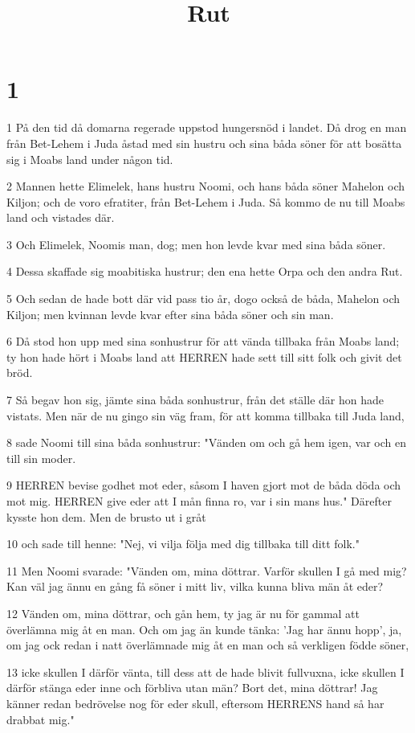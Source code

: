

\title{Rut}


\chapter{1}

\par 1 På den tid då domarna regerade uppstod hungersnöd i landet. Då drog en man från Bet-Lehem i Juda åstad med sin hustru och sina båda söner för att bosätta sig i Moabs land under någon tid.
\par 2 Mannen hette Elimelek, hans hustru Noomi, och hans båda söner Mahelon och Kiljon; och de voro efratiter, från Bet-Lehem i Juda. Så kommo de nu till Moabs land och vistades där.
\par 3 Och Elimelek, Noomis man, dog; men hon levde kvar med sina båda söner.
\par 4 Dessa skaffade sig moabitiska hustrur; den ena hette Orpa och den andra Rut.
\par 5 Och sedan de hade bott där vid pass tio år, dogo också de båda, Mahelon och Kiljon; men kvinnan levde kvar efter sina båda söner och sin man.
\par 6 Då stod hon upp med sina sonhustrur för att vända tillbaka från Moabs land; ty hon hade hört i Moabs land att HERREN hade sett till sitt folk och givit det bröd.
\par 7 Så begav hon sig, jämte sina båda sonhustrur, från det ställe där hon hade vistats. Men när de nu gingo sin väg fram, för att komma tillbaka till Juda land,
\par 8 sade Noomi till sina båda sonhustrur: "Vänden om och gå hem igen, var och en till sin moder.
\par 9 HERREN bevise godhet mot eder, såsom I haven gjort mot de båda döda och mot mig. HERREN give eder att I mån finna ro, var i sin mans hus." Därefter kysste hon dem. Men de brusto ut i gråt
\par 10 och sade till henne: "Nej, vi vilja följa med dig tillbaka till ditt folk."
\par 11 Men Noomi svarade: "Vänden om, mina döttrar. Varför skullen I gå med mig? Kan väl jag ännu en gång få söner i mitt liv, vilka kunna bliva män åt eder?
\par 12 Vänden om, mina döttrar, och gån hem, ty jag är nu för gammal att överlämna mig åt en man. Och om jag än kunde tänka: 'Jag har ännu hopp', ja, om jag ock redan i natt överlämnade mig åt en man och så verkligen födde söner,
\par 13 icke skullen I därför vänta, till dess att de hade blivit fullvuxna, icke skullen I därför stänga eder inne och förbliva utan män? Bort det, mina döttrar! Jag känner redan bedrövelse nog för eder skull, eftersom HERRENS hand så har drabbat mig."
